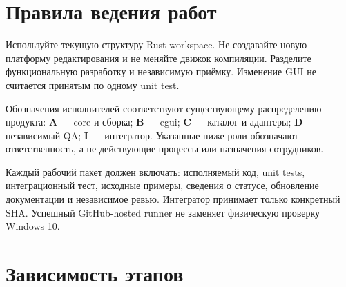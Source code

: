 \documentclass[11pt,a4paper,oneside]{scrreprt}
\begin{document}
\section{Правила ведения работ}\label{ux43fux440ux430ux432ux438ux43bux430-ux432ux435ux434ux435ux43dux438ux44f-ux440ux430ux431ux43eux442}

Используйте текущую структуру Rust workspace. Не создавайте новую платформу редактирования и не меняйте движок компиляции. Разделите функциональную разработку и независимую приёмку. Изменение GUI не считается принятым по одному unit test.

Обозначения исполнителей соответствуют существующему распределению продукта: \textbf{A} --- core и сборка; \textbf{B} --- egui; \textbf{C} --- каталог и адаптеры; \textbf{D} --- независимый QA; \textbf{I} --- интегратор. Указанные ниже роли обозначают ответственность, а не действующие процессы или назначения сотрудников.

Каждый рабочий пакет должен включать: исполняемый код, unit tests, интеграционный тест, исходные примеры, сведения о статусе, обновление документации и независимое ревью. Интегратор принимает только конкретный SHA. Успешный GitHub-hosted runner не заменяет физическую проверку Windows 10.

\section{Зависимость этапов}\label{ux437ux430ux432ux438ux441ux438ux43cux43eux441ux442ux44c-ux44dux442ux430ux43fux43eux432}
\end{document}
